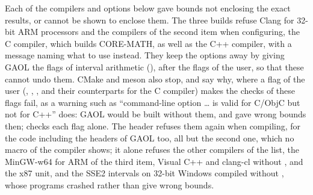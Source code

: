 Each of the compilers and options below gave bounds not enclosing the exact
results, or cannot be shown to enclose them. The three builds refuse Clang for
32-bit ARM processors and the compilers of the second item when configuring,
the C compiler, which builds CORE-MATH, as well as the C++ compiler, with a
message naming what to use instead. They keep the options
away by giving GAOL the flags of interval arithmetic (),
after the flags of the user, so that these cannot undo them. CMake and meson
also stop, and say why, where a flag of the user (,
, , and their counterparts for the C compiler)
makes the checks of these flags fail, as a warning such as ``command-line
option \ldots{} is valid for C/ObjC but not for C++'' does: GAOL would be
built without them, and gave wrong bounds then;  checks each
flag alone.\newinvfive{}
The header  refuses them again when compiling, for
the code including the headers of GAOL too, all but the second one, which no
macro of the compiler shows; it alone refuses the other compilers of the list,
the MinGW-w64 for ARM of the third item, Visual C++ and clang-cl without
, and the x87 unit, and the SSE2 intervals on 32-bit
Windows compiled without , whose programs crashed
rather than give wrong bounds.


